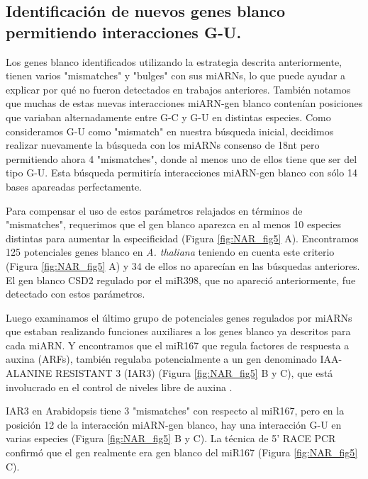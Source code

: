 \subsection{Identificación de nuevos genes blanco permitiendo interacciones G-U.}

Los genes blanco identificados utilizando la estrategia descrita anteriormente, tienen varios "mismatches" y "bulges" con sus miARNs, lo que puede ayudar a explicar por qué no fueron detectados en trabajos anteriores.
También notamos que muchas de estas nuevas interacciones miARN-gen blanco contenían posiciones que variaban alternadamente entre G-C y G-U en distintas especies.
Como consideramos G-U como "mismatch" en nuestra búsqueda inicial, decidimos realizar nuevamente la búsqueda con los miARNs consenso de 18nt pero permitiendo ahora 4 "mismatches", donde al menos uno de ellos tiene que ser del tipo G-U.
Esta búsqueda permitiría interacciones miARN-gen blanco con sólo 14 bases apareadas perfectamente.

Para compensar el uso de estos parámetros relajados en términos de "mismatches", requerimos que el gen blanco aparezca en al menos 10 especies distintas para aumentar la especificidad (Figura \ref{fig:NAR_fig5} A).
Encontramos 125 potenciales genes blanco en \textit{A. thaliana} teniendo en cuenta este criterio (Figura \ref{fig:NAR_fig5} A) y 34 de ellos no aparecían en las búsquedas anteriores.
El gen blanco CSD2 regulado por el miR398, que no apareció anteriormente, fue detectado con estos parámetros. 

Luego examinamos el último grupo de potenciales genes regulados por miARNs que estaban realizando funciones auxiliares a los genes blanco ya descritos para cada miARN. 
Y encontramos que el miR167 que regula factores de respuesta a auxina (ARFs), también regulaba potencialmente a un gen denominado IAA-ALANINE RESISTANT 3 (IAR3) (Figura \ref{fig:NAR_fig5} B y C), que está involucrado en el control de niveles libre de auxina \citep{Davies1999,Rampey2004}.

IAR3 en Arabidopsis tiene 3 "mismatches" con respecto al miR167, pero en la posición 12 de la interacción miARN-gen blanco, hay una interacción G-U en varias especies (Figura \ref{fig:NAR_fig5} B y C).
La técnica de 5’ RACE PCR confirmó que el gen realmente era gen blanco del miR167 (Figura \ref{fig:NAR_fig5} C).

